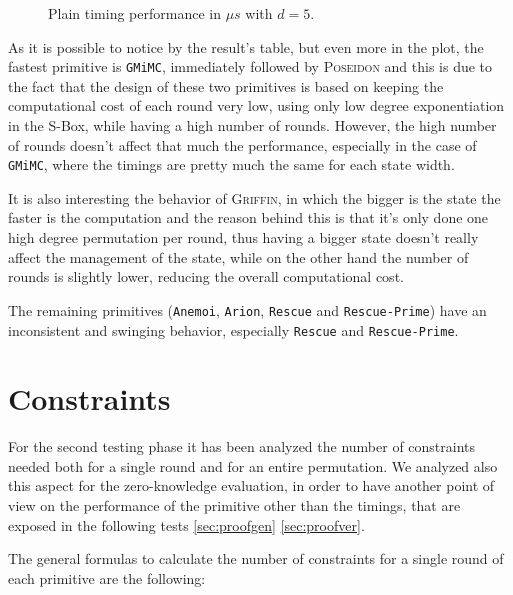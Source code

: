 \documentclass[12pt, a4paper]{report}
\begin{document}
\begin{figure}[H]
  \hspace{60pt}
  \caption{Plain timing performance in $\mu s$ with $d = 5$.}\label{plot:plain}
\end{figure}

As it is possible to notice by the result's table, but even more in the plot, the fastest primitive is \texttt{GMiMC}, immediately followed by \textsc{Poseidon} and this is due to the fact that the design of these two primitives is based on keeping the computational cost of each round very low, using only low degree exponentiation in the S-Box, while having a high number of rounds.
However, the high number of rounds doesn't affect that much the performance, especially in the case of \texttt{GMiMC}, where the timings are pretty much the same for each state width.

It is also interesting the behavior of \textsc{Griffin}, in which the bigger is the state the faster is the computation and the reason behind this is that it's only done one high degree permutation per round, thus having a bigger state doesn't really affect the management of the state, while on the other hand the number of rounds is slightly lower, reducing the overall computational cost.

The remaining primitives (\texttt{Anemoi}, \texttt{Arion}, \texttt{Rescue} and \texttt{Rescue-Prime}) have an inconsistent and swinging behavior, especially \texttt{Rescue} and \texttt{Rescue-Prime}.

\section{Constraints}\label{sec:constraints}

For the second testing phase it has been analyzed the number of constraints needed both for a single round and for an entire permutation.
We analyzed also this aspect for the zero-knowledge evaluation, in order to have another point of view on the performance of the primitive other than the timings, that are exposed in the following tests \autoref{sec:proofgen} \autoref{sec:proofver}.

The general formulas to calculate the number of constraints for a single round of each primitive are the following:
\end{document}
